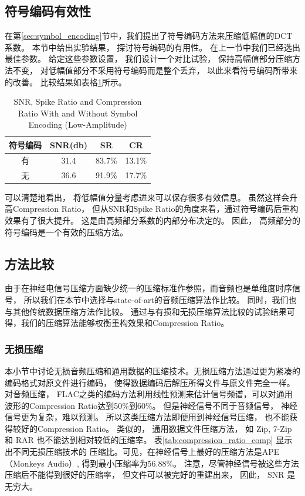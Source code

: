\subsection{符号编码有效性}
在第\ref{sec:symbol_encoding}节中，我们提出了符号编码方法来压缩低幅值的DCT系数。 本节中给出实验结果， 探讨符号编码的有用性。 在上一节中我们已经选出最佳参数。 给定这些参数设置， 我们设计一个对比试验， 保持高幅值部分压缩方法不变， 对低幅值部分不采用符号编码而是整个丢弃， 以此来看符号编码所带来的改善。 比较结果如表格\ref{tab:T1}所示。\\


\begin{table}[ht]
\centering
  \begin{tabular}{c c c c}
  \hline\hline
  符号编码 & SNR(db) & SR & CR \\ [0.5ex] %
  \hline
  有 & 31.4 & 83.7\% & 13.1\% \\
  无 & 36.6 & 91.9\% & 17.7\% \\
  \hline
  \end{tabular}
  \caption{SNR, Spike Ratio and Compression Ratio With and Without Symbol Encoding (Low-Amplitude)}
  \centering \label{tab:T1}
\end{table}


可以清楚地看出， 将低幅值分量考虑进来可以保存很多有效信息。 虽然这样会升高Compression Ratio， 但从SNR和Spike Ratio的角度来看，通过符号编码后重构效果有了很大提升。 这是由高频部分系数的内部分布决定的。 因此， 高频部分的符号编码是一个有效的压缩方法。



\subsection{方法比较}
由于在神经电信号压缩方面缺少统一的压缩标准作参照，而音频也是单维度时序信号， 所以我们在本节中选择与state-of-art的音频压缩算法作比较。 同时，我们也与其他传统数据压缩方法作比较。 通过与有损和无损压缩算法比较的试验结果可得，我们的压缩算法能够权衡重构效果和Compression Ratio。


\subsubsection{无损压缩}
本小节中讨论无损音频压缩和通用数据的压缩技术。无损压缩方法通过更为紧凑的编码格式对原文件进行编码， 使得数据编码后解压所得文件与原文件完全一样。 对音频压缩， FLAC之类的编码方法利用线性预测来估计信号频谱，可以对通用波形的Compression Ratio达到50\%到60\%\cite{23}。 但是神经信号不同于音频信号， 神经信号更为复杂，难以预测。 所以这类压缩方法即便用到神经信号压缩， 也不能获得较好的Compression Ratio。 类似的， 通用数据文件压缩方法， 如 Zip, 7-Zip 和 RAR 也不能达到相对较低的压缩率。 表\ref{tab:compression_ratio_comp} 显示出不同无损压缩技术的
压缩比。可见，在神经信号上最好的压缩方法是APE （Monkeys Audio）, 得到最小压缩率为56.88\%。 注意，尽管神经信号被这些方法压缩后不能得到很好的压缩率， 但文件可以被完好的重建出来， 因此， SNR 是无穷大。 


